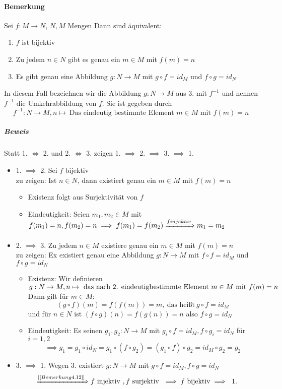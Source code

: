 \documentclass[a4paper]{scrartcl}
\theoremstyle{definition}
\theoremstyle{plain}
\theoremstyle{plain}
\theoremstyle{remark}
\theoremstyle{remark}
\theoremstyle{remark}
\theoremstyle{remark}
\theoremstyle{remark}
\begin{document}
\paragraph{Bemerkung}
\label{sec-2-6-7-6}
Sei $f:M\to N$, $N,M$ Mengen
Dann sind äquivalent:
\begin{enumerate}
\item $f$ ist bijektiv
\item Zu jedem $n\in N$ gibt es genau ein $m\in M$ mit $f(m) = n$
\item Es gibt genau eine Abbildung $g:N\to M$ mit $g\circ f = id_M$ und $f\circ g = id_N$
\end{enumerate}
In diesem Fall bezeichnen wir die Abbildung $g:N\to M$ aus 3. mit $f^{-1}$ und nennen $f^{-1}$ die Umkehrabbildung von $f$. Sie ist gegeben durch
\[f^{-1} : N\to M, n\mapsto~\text{Das eindeutig bestimmte Element $m\in M$ mit $f(m) = n$}\]
\subparagraph{Beweis}
\label{sec-2-6-7-6-1}
Statt 1. $\iff$ 2. und 2. $\iff$ 3. zeigen 1. $\implies$ 2. $\implies$ 3. $\implies$ 1.
\begin{itemize}
\item 1. $\implies$ 2. Sei $f$ bijektiv \\
        zu zeigen: Ist $n\in N$, dann existiert genau ein $m\in M$ mit $f(m) = n$ \\
\begin{itemize}
\item Existenz folgt aus Surjektivität von $f$
\item Eindeutigkeit: Seien $m_1,m_2 \in M$  mit \(f(m_1) = n, f(m_2) = n \implies f(m_1) = f(m_2) \xRightarrow{f injektiv} m_1 = m_2\)
\end{itemize}
\item 2. $\implies$ 3. Zu jedem $n\in M$ existiere genau ein $m\in M$ mit $f(m) = n$ \\
        zu zeigen: Ex existiert genau eine Abbildung $g:N\to M$ mit $f\circ f = id_M$ und $f\circ g = id_N$
\begin{itemize}
\item Existenz: Wir definieren \(g:N\to M, n\mapsto~\text{das nach 2. eindeutig \\
		  bestimmte Element $m\in M$ mit $f(m) = n$}\) \\
Dann gilt für $m\in M$: \[(g\circ f)(m) = f(f(m)) = m,~\text{das heißt}~ g\circ f = id_M\]
und für $n\in N$ ist $(f\circ g)(n) = f(g(n)) = n$ also $f\circ g = id_N$
\item Eindeutigkeit: Es seinen $g_1,g_2:N\to M$ mit $g_i \circ f = id_M, f\circ g_i = id_N$ für $i = 1,2$ \\
          \[\implies g_1 = g_1 \circ id_N = g_1 \circ (f\circ g_2) = (g_1 \circ f) \circ g_2 = id_M \circ g_2 = g_2\]
\end{itemize}
\item 3. $\implies$ 1. Wegen 3. existiert $g:N\to M$ mit $g\circ f = id_M,f\circ g = id_N$ \\
        \[\xRightarrow{[[Bemerkung 4.12]]} f~\text{injektiv}~,f~\text{surjektiv}~\implies f~\text{bijektiv}\implies~\text{1.}\]
\end{itemize}
\end{document}
